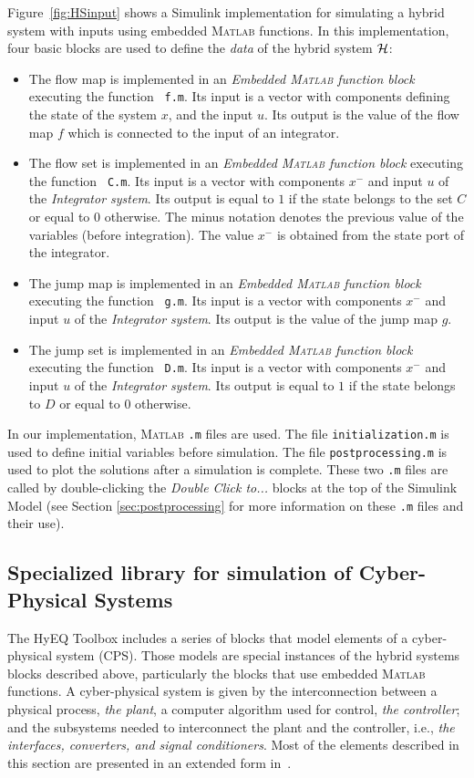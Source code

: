 \documentclass{article}
\newcommand{\matlab}{\textsc{Matlab}}
\begin{document}
Figure~\ref{fig:HSinput} shows a Simulink implementation for simulating a hybrid system with inputs using embedded \matlab{} functions. In this implementation, four basic blocks are used to define the {\em data} of the hybrid system $\mathcal{H}$:
\begin{itemize}
\item The flow map is implemented in an {\em Embedded \matlab{} function block} executing the function {\tt
f.m}. Its input is a vector with components defining the state of the system $x$, and the input $u$.
Its output is the value of the flow map $f$ which is connected to the  input of an integrator.
\item The flow set is implemented in an {\em Embedded \matlab{} function block} executing the function {\tt
C.m}. Its input is a vector with components $x^-$ and input $u$ of the {\em Integrator system}. Its output is equal to $1$ if the state belongs to the set $C$ or equal to $0$ otherwise.
The minus notation denotes the previous value of the variables (before integration). The value $x^-$ is obtained from the state port of the integrator.
\item The jump map is implemented in an {\em Embedded \matlab{} function block} executing the function {\tt
g.m}. Its input is a vector with components $x^-$ and input $u$ of the {\em Integrator system}. Its output is the value of the jump map $g$.
\item The jump set is implemented in an {\em Embedded \matlab{} function block} executing the function {\tt
D.m}. Its input is a vector with components $x^-$ and input $u$ of the {\em Integrator system}. Its output is equal to $1$ if the state belongs to $D$ or equal to $0$ otherwise.
\end{itemize}


In our implementation, \matlab{} {\tt .m} files are used. The file {\tt initialization.m} is used to define initial variables before simulation. The file {\tt postprocessing.m} is used to plot the solutions after a simulation is complete. These two {\tt .m} files are called by double-clicking the {\em Double Click to...} blocks at the top of the Simulink Model (see Section \ref{sec:postprocessing} for more information on these {\tt .m} files and their use).


\subsection{Specialized library for simulation of Cyber-Physical Systems}
\label{sec:CPS}
The HyEQ Toolbox includes a series of blocks that model elements of a cyber-physical system (CPS). Those models are special instances of the hybrid systems blocks described above, particularly the blocks that use embedded \matlab{} functions.
A cyber-physical system is given by the interconnection between a physical process, {\em the plant}, a computer algorithm used for control, {\em the controller}; and  the subsystems needed to interconnect the plant and the controller, i.e., 
{\em the interfaces,  converters, and signal conditioners}. Most of the elements described in this section are presented in an extended form in~\cite{San17}.
\end{document}
